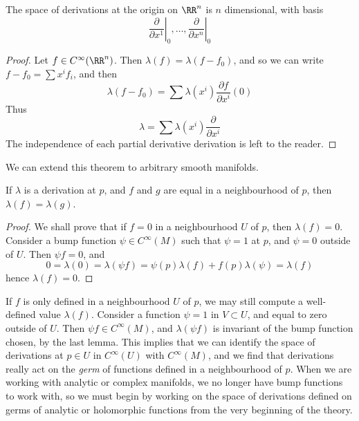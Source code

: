 \begin{theorem}
    The space of derivations at the origin on $\RR^n$ is $n$ dimensional, with basis
    \[ \left.\frac{\partial}{\partial x^1}\right|_0, \dots, \left.\frac{\partial}{\partial x^n}\right|_0 \]
\end{theorem}
\begin{proof}
    Let $f \in C^\infty(\RR^n)$. Then $\lambda(f) = \lambda(f - f_0)$, and so we can write $f - f_0 = \sum x^i f_i$, and then
    \[ \lambda(f - f_0) = \sum \lambda(x^i) \frac{\partial f}{\partial x^i}(0) \]
    Thus
    \[ \lambda = \sum \lambda(x^i) \frac{\partial}{\partial x^i} \]
    The independence of each partial derivative derivation is left to the reader.
\end{proof}

We can extend this theorem to arbitrary smooth manifolds.

\begin{lemma}
    If $\lambda$ is a derivation at $p$, and $f$ and $g$ are equal in a neighbourhood of $p$, then $\lambda(f) = \lambda(g)$.
\end{lemma}
\begin{proof}
    We shall prove that if $f = 0$ in a neighbourhood $U$ of $p$, then $\lambda(f) = 0$. Consider a bump function $\psi \in C^\infty(M)$ such that $\psi = 1$ at $p$, and $\psi = 0$ outside of $U$. Then $\psi f = 0$, and
    \[ 0 = \lambda(0) = \lambda(\psi f) = \psi(p) \lambda(f) + f(p) \lambda(\psi) = \lambda(f) \]
    hence $\lambda(f) = 0$.
\end{proof}

If $f$ is only defined in a neighbourhood $U$ of $p$, we may still compute a well-defined value $\lambda(f)$. Consider a function $\psi = 1$ in $V \subset U$, and equal to zero outside of $U$. Then $\psi f \in C^\infty(M)$, and $\lambda(\psi f)$ is invariant of the bump function chosen, by the last lemma. This implies that we can identify the space of derivations at $p \in U$ in $C^\infty(U)$ with $C^\infty(M)$, and we find that derivations really act on the \emph{germ} of functions defined in a neighbourhood of $p$. When we are working with analytic or complex manifolds, we no longer have bump functions to work with, so we must begin by working on the space of derivations defined on germs of analytic or holomorphic functions from the very beginning of the theory.

